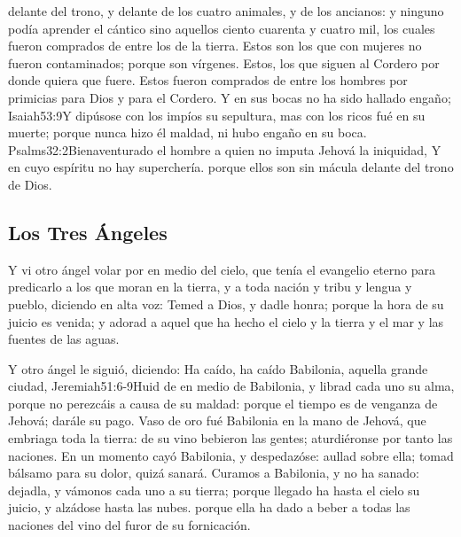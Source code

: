  delante del trono, y delante de los cuatro animales, y de los ancianos: y ninguno podía aprender el cántico sino aquellos ciento cuarenta y cuatro mil, los cuales fueron comprados de entre los de la tierra. 
Estos son los que con mujeres no fueron contaminados; porque son vírgenes. Estos, los que siguen al Cordero por donde quiera que fuere. Estos fueron comprados de entre los hombres por primicias para Dios y para el Cordero. 
Y en sus bocas no ha sido hallado engaño;%
				   {Isaiah}{53:9}{Y dipúsose con los impíos su sepultura, mas con los ricos fué en su muerte; porque nunca hizo él maldad, ni hubo engaño en su boca.}%
				   {Psalms}{32:2}{Bienaventurado el hombre a quien no imputa Jehová la iniquidad, Y en cuyo espíritu no hay superchería.}
 porque ellos son sin mácula delante del trono de Dios.
\subsection*{Los Tres Ángeles}
Y vi otro ángel volar por en medio del cielo, que tenía el evangelio eterno para predicarlo a los que moran en la tierra, y a toda nación y tribu y lengua y pueblo, 
diciendo en alta voz: Temed a Dios, y dadle honra; porque la hora de su juicio es venida; y adorad a aquel que ha hecho el cielo y la tierra y el mar y las fuentes de las aguas.

Y otro ángel le siguió, diciendo: Ha caído, ha caído Babilonia, aquella grande ciudad,%
				  {Jeremiah}{51:6-9}{Huid de en medio de Babilonia, y librad cada uno su alma, porque no perezcáis a causa de su maldad: porque el tiempo es de venganza de Jehová; darále su pago. Vaso de oro fué Babilonia en la mano de Jehová, que embriaga toda la tierra: de su vino bebieron las gentes; aturdiéronse por tanto las naciones. En un momento cayó Babilonia, y despedazóse: aullad sobre ella; tomad bálsamo para su dolor, quizá sanará. Curamos a Babilonia, y no ha sanado: dejadla, y vámonos cada uno a su tierra; porque llegado ha hasta el cielo su juicio, y alzádose hasta las nubes.}
 porque ella ha dado a beber a todas las naciones del vino del furor de su fornicación.

